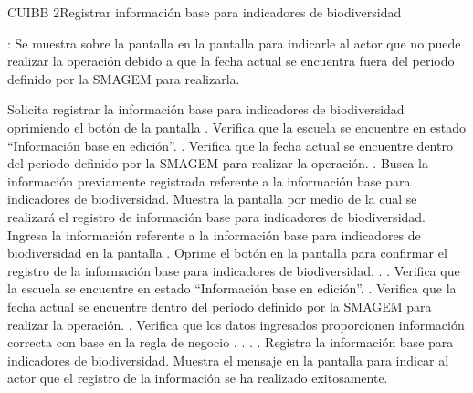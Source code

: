 \begin{UseCase}{CUIBB 2}{Registrar información base para indicadores de biodiversidad}
{\begin{UClist}
	    \UCli {}: Se muestra sobre la pantalla en la pantalla  para indicarle al actor que no puede realizar la operación debido a que la fecha actual se encuentra fuera del periodo definido por la SMAGEM para realizarla.
	\end{UClist}
    }


\end{UseCase}

\begin{UCtrayectoria}
    \UCpaso[\UCactor] Solicita registrar la información base para indicadores de biodiversidad oprimiendo el botón \botReg de la pantalla .
    \UCpaso[\UCsist] Verifica que la escuela se encuentre en estado ``Información base en edición''. .
    \UCpaso[\UCsist] Verifica que la fecha actual se encuentre dentro del periodo definido por la SMAGEM para realizar la operación. .
    \UCpaso[\UCsist] Busca la información previamente registrada referente a la información base para indicadores de biodiversidad.
    \UCpaso[\UCsist] Muestra la pantalla  por medio de la cual se realizará el registro de información base para indicadores de biodiversidad.
    \UCpaso[\UCactor] Ingresa la información referente a la información base para indicadores de biodiversidad en la pantalla . \label{cuibb2:IngresarDatos}
    \UCpaso[\UCactor] Oprime el botón  en la pantalla  para confirmar el registro de la información base para indicadores de biodiversidad. . .    
    \UCpaso[\UCsist] Verifica que la escuela se encuentre en estado ``Información base en edición''. . \label{cuibb2:VerificarRegistro}
    \UCpaso[\UCsist] Verifica que la fecha actual se encuentre dentro del periodo definido por la SMAGEM para realizar la operación. .
    \UCpaso[\UCsist] Verifica que los datos ingresados proporcionen información correcta con base en la regla de negocio . . . .
    \UCpaso[\UCsist] Registra la información base para indicadores de biodiversidad.
    \UCpaso[\UCsist] Muestra el mensaje  en la pantalla  para indicar al actor que el registro de la información se ha realizado exitosamente.    
 \end{UCtrayectoria}
 
